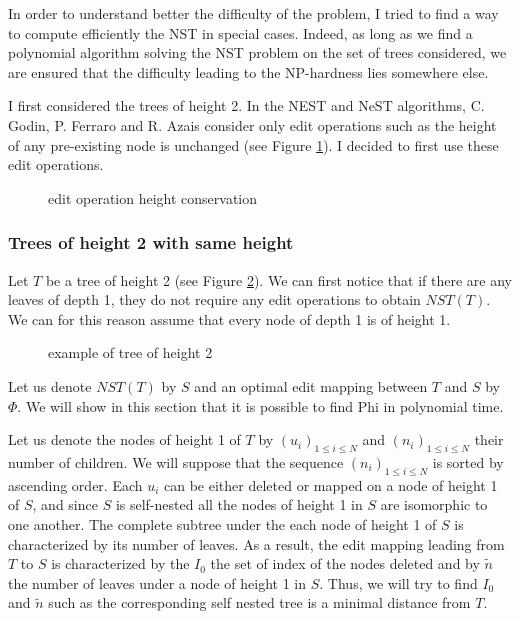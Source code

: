 In order to understand better the difficulty of the problem, I tried
to find a way to compute efficiently the NST in special cases. Indeed,
as long as we find a polynomial algorithm solving the NST problem on
the set of trees considered, we are ensured that the difficulty
leading to the NP-hardness lies somewhere else.

I first considered the trees of height 2. In the NEST and NeST
algorithms, C. Godin, P. Ferraro and R. Azais consider only edit
operations such as the height of any pre-existing node is unchanged
(see Figure \ref{fig:edit_height}). I decided to first use these edit
operations.
\begin{figure}
  \centering
  
  \caption{edit operation height conservation}
  \label{fig:edit_height}
\end{figure}

\subsubsection{Trees of height 2 with same height} 
Let $T$ be a tree of height 2 (see Figure \ref{fig:height2}). We can
first notice that if there are any leaves of depth 1, they do not
require any edit operations to obtain $NST(T)$. We can for this reason
assume that every node of depth 1 is of height 1.

\begin{figure}
  \centering
  
  \caption{example of tree of height 2}
  \label{fig:height2}
\end{figure}

Let us denote $NST(T)$ by $S$ and an optimal edit mapping between $T$
and $S$ by $\Phi$. We will show in this section that it is possible to
find Phi in polynomial time.

Let us denote the nodes of height 1 of $T$ by
$(u_{i})_{1 \leqslant i \leqslant N}$ and
$(n_{i})_{1 \leqslant i \leqslant N}$ their number of children. We
will suppose that the sequence $(n_{i})_{1 \leqslant i \leqslant N}$ is
sorted by ascending order. Each $u_{i}$ can be either
deleted or mapped on a node of height 1 of $S$, and since $S$ is
self-nested all the nodes of height 1 in $S$ are isomorphic to one
another. The complete subtree under the each node of height 1 of $S$
is characterized by its number of leaves. As a result, the edit
mapping leading from $T$ to $S$ is characterized by the $I_{0}$ the
set of index of the nodes deleted and by $\tilde{n}$ the number of
leaves under a node of height 1 in $S$. Thus, we will try to find
$I_{0}$ and $\tilde{n}$ such as the corresponding self nested tree is
a minimal distance from $T$.

